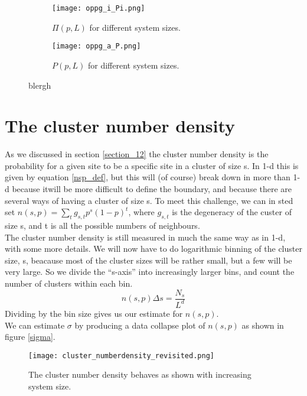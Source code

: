 \documentclass[a4paper,english, 10pt, twoside]{article}
\begin{document}
\begin{figure}[H]
\centering
\begin{subfigure}[b]{0.48\textwidth}
 \texttt{[image: oppg\_i\_Pi.png]}
 \caption{$\Pi(p,L)$ for different system sizes.}
 \label{sect_15:pi}
\end{subfigure}
\begin{subfigure}[b]{0.48\textwidth}
  \texttt{[image: oppg\_a\_P.png]}
 \caption{$P(p,L)$ for different system sizes.}
 \label{sect_15:P}
\end{subfigure}
\caption{blergh}
\label{sect_15}
\end{figure}

\section{The cluster number density}
As we discussed in section \ref{section_12} the cluster number density is the probability for a given site to be a specific 
site in a cluster of size s. In 1-d this is given by equation \ref{nsp_def}, but this will (of course) break down in more than 
1-d because itwill be more difficult to define the boundary, and because there are several ways of having a cluster of size s. 
To meet this challenge, we can in sted set $n(s,p) = \sum\limits_t g_{s,t}p^s(1-p)^t$, where $g_{s,t}$ is the degeneracy of the 
custer of size s, and t is all the possible numbers of neighbours.\\
The cluster number density is still measured in much the same way as in 1-d, with some more details. We will now have to do 
logarithmic binning of the cluster size, s, beacause most of the cluster sizes will be rather small, but a few will be very large. 
So we divide the ``s-axis'' into increasingly larger bins, and count the number of clusters within each bin.
$$
n(s,p)\Delta s = \frac{N_s}{L^d}
$$
Dividing by the bin size gives us our estimate for $n(s,p)$.\\
We can estimate $\sigma$ by producing a data collapse plot of $n(s,p)$ as shown in figure \ref{sigma}.

\begin{figure}[H]
 \centering
 \texttt{[image: cluster\_numberdensity\_revisited.png]}
 \caption{The cluster number density behaves as shown with increasing system size.}
\end{figure}
\end{document}
